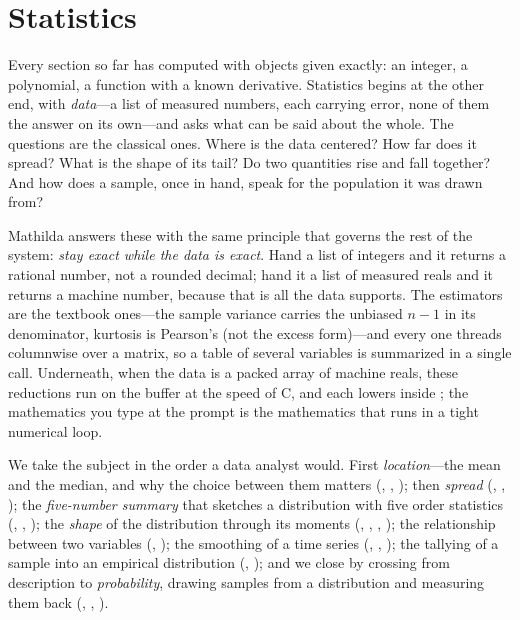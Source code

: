 \section{Statistics}
\label{sec:statistics}

Every section so far has computed with objects given exactly: an integer, a
polynomial, a function with a known derivative. Statistics begins at the other
end, with \emph{data}---a list of measured numbers, each carrying error, none of
them the answer on its own---and asks what can be said about the whole. The
questions are the classical ones. Where is the data centered? How far does it
spread? What is the shape of its tail? Do two quantities rise and fall together?
And how does a sample, once in hand, speak for the population it was drawn
from?

Mathilda answers these with the same principle that governs the rest of the
system: \emph{stay exact while the data is exact}. Hand  a list of
integers and it returns a rational number, not a rounded decimal; hand it a list
of measured reals and it returns a machine number, because that is all the data
supports. The estimators are the textbook ones---the sample variance carries the
unbiased \(n-1\) in its denominator, kurtosis is Pearson's (not the excess
form)---and every one threads columnwise over a matrix, so a table of several
variables is summarized in a single call. Underneath, when the data is a packed
array of machine reals, these reductions run on the buffer at the speed of C, and
each lowers inside ; the mathematics you type at the prompt is the
mathematics that runs in a tight numerical loop.

We take the subject in the order a data analyst would. First \emph{location}---the
mean and the median, and why the choice between them matters (,
, ); then \emph{spread} (,
, ); the \emph{five-number summary} that
sketches a distribution with five order statistics (, ,
); the \emph{shape} of the distribution through its moments (,
, , ); the relationship between two
variables (, ); the smoothing of a time series
(, , ); the tallying
of a sample into an empirical distribution (, ); and we close
by crossing from description to \emph{probability}, drawing samples from a
distribution and measuring them back (, ,
).

